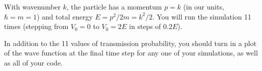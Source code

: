 \documentclass{article}
\begin{document}
With wavenumber $k$, the particle has a momentum $p=k$ (in our units, $\hbar=m=1$) and total energy $E=p^2/2m = k^2/2$. You will run the simulation 11 times (stepping from $V_0=0$ to $V_0=2E$ in steps of $0.2E$).

In addition to the 11 values of transmission probability, you should turn in a plot of the wave function at the final time step for any one of your simulations, as well as all of your code.
\end{document}

